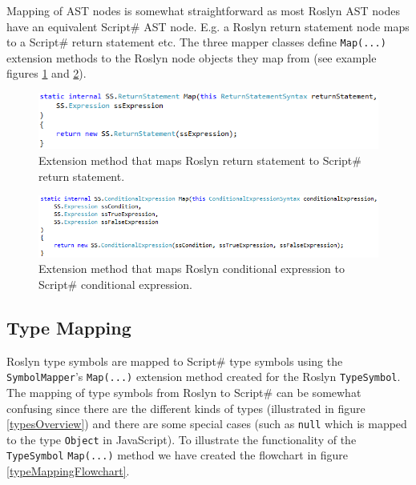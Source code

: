 		Mapping of AST nodes is somewhat straightforward as most Roslyn AST nodes have an equivalent Script\# AST node. E.g. a Roslyn return statement node maps to a Script\# return statement etc. The three mapper classes define \texttt{Map(...)} extension methods to the Roslyn node objects they map from (see example figures \ref{returnStatementMap} and \ref{conditionaleExpressionMap}).

		\begin{figure}[H]
			\begin{center}
				\centerline{\includegraphics[width=14cm]{resources/images/ReturnStatementMap.png}}
			\end{center}
			\caption{Extension method that maps Roslyn return statement to Script\# return statement.}
			\label{returnStatementMap}
		\end{figure}

		\begin{figure}[H]
			\begin{center}
				\centerline{\includegraphics[width=14cm]{resources/images/ConditionalExpressionMap.png}}
			\end{center}
			\caption{Extension method that maps Roslyn conditional expression to Script\# conditional expression.}
			\label{conditionaleExpressionMap}
		\end{figure}

	\subsection{Type Mapping} %
	\label{sub:type_mapping}
		Roslyn type symbols are mapped to Script\# type symbols using the \texttt{SymbolMapper}’s \texttt{Map(...)} extension method created for the Roslyn \texttt{TypeSymbol}. The mapping of type symbols from Roslyn to Script\# can be somewhat confusing since there are the different kinds of types (illustrated in figure \ref{typesOverview}) and there are some special cases (such as \texttt{null} which is mapped to the type \texttt{Object} in JavaScript). To illustrate the functionality of the \texttt{TypeSymbol} \texttt{Map(...)} method we have created the flowchart in figure \ref{typeMappingFlowchart}.

